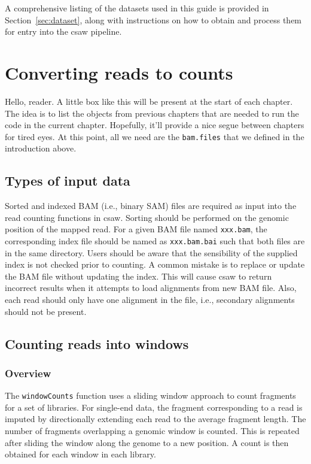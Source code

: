 \documentclass[12pt]{report}
\newcommand{\pkgname}{csaw}
\newcommand{\code}[1]{{\small\texttt{#1}}}
\newenvironment{combox}
{ \begin{shaded}\begin{center}\begin{minipage}[t]{0.95\textwidth} }
{ \end{minipage}\end{center}\end{shaded} }
\begin{document}
A comprehensive listing of the datasets used in this guide is provided in Section~\ref{sec:dataset}, along with instructions on how to obtain and process them for entry into the \pkgname{} pipeline.


\chapter{Converting reads to counts}
\label{chap:count}
\begin{combox}
Hello, reader.
A little box like this will be present at the start of each chapter.
The idea is to list the objects from previous chapters that are needed to run the code in the current chapter.
Hopefully, it'll provide a nice segue between chapters for tired eyes.
At this point, all we need are the \code{bam.files} that we defined in the introduction above.
\end{combox}

\section{Types of input data}
Sorted and indexed BAM (i.e., binary SAM) files are required as input into the read counting functions in \pkgname{}. 
Sorting should be performed on the genomic position of the mapped read.
For a given BAM file named \code{xxx.bam}, the corresponding index file should be named as \code{xxx.bam.bai} such that both files are in the same directory. 
Users should be aware that the sensibility of the supplied index is not checked prior to counting. 
A common mistake is to replace or update the BAM file without updating the index. 
This will cause \pkgname{} to return incorrect results when it attempts to load alignments from new BAM file.
Also, each read should only have one alignment in the file, i.e., secondary alignments should not be present.

\section{Counting reads into windows}

\subsection{Overview}
The \code{windowCounts} function uses a sliding window approach to count fragments for a set of libraries. 
For single-end data, the fragment corresponding to a read is imputed by directionally extending each read to the average fragment length. 
The number of fragments overlapping a genomic window is counted. 
This is repeated after sliding the window along the genome to a new position. 
A count is then obtained for each window in each library. 
\end{document}
